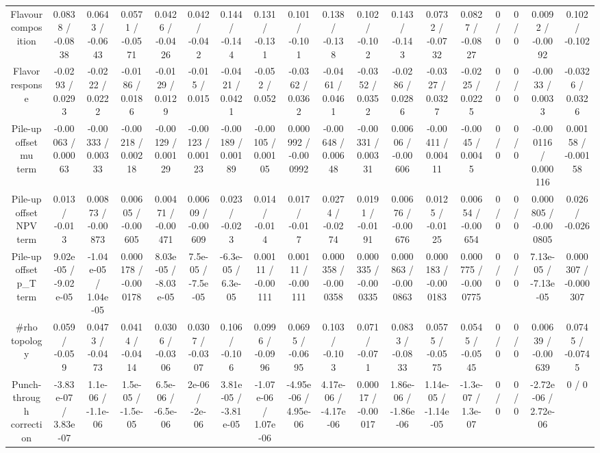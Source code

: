 \documentclass[10pt]{article}
\begin{document}
\begin{table}[htbp]
\begin{center}
\begin{tabular}{|c|c|c|c|c|c|c|c|c|c|c|c|c|c|c|c|c|c|}
  Flavour composition & 0.0838 / -0.0838 & 0.0643 / -0.0643 & 0.0571 / -0.0571 & 0.0426 / -0.0426 & 0.042 / -0.042 & 0.144 / -0.144 & 0.131 / -0.131 & 0.101 / -0.101 & 0.138 / -0.138 & 0.102 / -0.102 & 0.143 / -0.143 & 0.0732 / -0.0732 & 0.0827 / -0.0827 & 0 / 0 & 0 / 0 & 0.0092 / -0.0092 & 0.102 / -0.102 \\ 
  Flavor response & -0.0293 / 0.0293 & -0.0222 / 0.0222 & -0.0186 / 0.0186 & -0.0129 / 0.0129 & -0.015 / 0.015 & -0.0421 / 0.0421 & -0.052 / 0.052 & -0.0362 / 0.0362 & -0.0461 / 0.0461 & -0.0352 / 0.0352 & -0.0286 / 0.0286 & -0.0327 / 0.0327 & -0.0225 / 0.0225 & 0 / 0 & 0 / 0 & -0.0033 / 0.0033 & -0.0326 / 0.0326 \\ 
  Pile-up offset mu term & -0.00063 / 0.00063 & -0.00333 / 0.00333 & -0.00218 / 0.00218 & -0.00129 / 0.00129 & -0.00123 / 0.00123 & -0.00189 / 0.00189 & -0.00105 / 0.00105 & 0.000992 / -0.000992 & -0.00648 / 0.00648 & -0.00331 / 0.00331 & 0.00606 / -0.00606 & -0.00411 / 0.00411 & -0.0045 / 0.0045 & 0 / 0 & 0 / 0 & -0.000116 / 0.000116 & 0.00158 / -0.00158 \\ 
  Pile-up offset NPV term & 0.013 / -0.013 & 0.00873 / -0.00873 & 0.00605 / -0.00605 & 0.00471 / -0.00471 & 0.00609 / -0.00609 & 0.023 / -0.023 & 0.014 / -0.014 & 0.017 / -0.017 & 0.0274 / -0.0274 & 0.0191 / -0.0191 & 0.00676 / -0.00676 & 0.0125 / -0.0125 & 0.00654 / -0.00654 & 0 / 0 & 0 / 0 & 0.000805 / -0.000805 & 0.026 / -0.026 \\ 
  Pile-up offset p_{T} term & 9.02e-05 / -9.02e-05 & -1.04e-05 / 1.04e-05 & 0.000178 / -0.000178 & 8.03e-05 / -8.03e-05 & 7.5e-05 / -7.5e-05 & -6.3e-05 / 6.3e-05 & 0.00111 / -0.00111 & 0.00111 / -0.00111 & 0.000358 / -0.000358 & 0.000335 / -0.000335 & 0.000863 / -0.000863 & 0.000183 / -0.000183 & 0.000775 / -0.000775 & 0 / 0 & 0 / 0 & 7.13e-05 / -7.13e-05 & 0.000307 / -0.000307 \\ 
  #rho topology & 0.059 / -0.059 & 0.0473 / -0.0473 & 0.0414 / -0.0414 & 0.0306 / -0.0306 & 0.0307 / -0.0307 & 0.106 / -0.106 & 0.0996 / -0.0996 & 0.0695 / -0.0695 & 0.103 / -0.103 & 0.071 / -0.071 & 0.0833 / -0.0833 & 0.0575 / -0.0575 & 0.0545 / -0.0545 & 0 / 0 & 0 / 0 & 0.00639 / -0.00639 & 0.0745 / -0.0745 \\ 
  Punch-through correction & -3.83e-07 / 3.83e-07 & 1.1e-06 / -1.1e-06 & 1.5e-05 / -1.5e-05 & 6.5e-06 / -6.5e-06 & 2e-06 / -2e-06 & 3.81e-05 / -3.81e-05 & -1.07e-06 / 1.07e-06 & -4.95e-06 / 4.95e-06 & 4.17e-06 / -4.17e-06 & 0.00017 / -0.00017 & 1.86e-06 / -1.86e-06 & 1.14e-05 / -1.14e-05 & -1.3e-07 / 1.3e-07 & 0 / 0 & 0 / 0 & -2.72e-06 / 2.72e-06 & 0 / 0 \\ 

\end{tabular}
\end{center}
\end{table}
\end{document}
